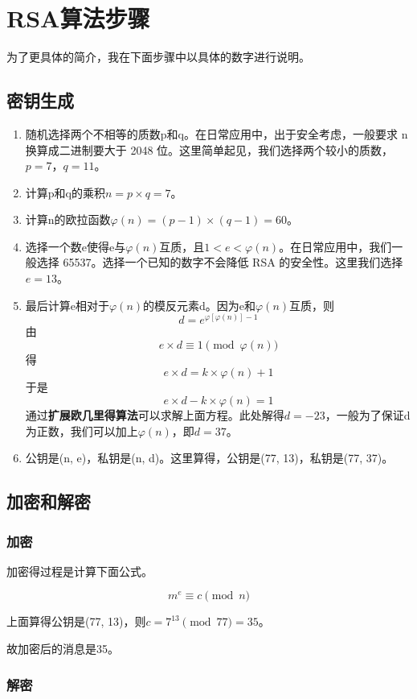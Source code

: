 \chapter{RSA算法步骤}

为了更具体的简介，我在下面步骤中以具体的数字进行说明。

\section{密钥生成}
\begin{enumerate}
    \item 随机选择两个不相等的质数p和q。在日常应用中，出于安全考虑，一般要求 n 换算成二进制要大于 2048 位。这里简单起见，我们选择两个较小的质数，$p=7，q=11$。
    \item 计算p和q的乘积$n = p \times q = 7$。
    \item 计算n的欧拉函数$\varphi(n) = (p-1) \times (q-1) = 60$。
    \item 选择一个数e使得e与$\varphi(n)$互质，且$1 < e < \varphi(n)$。在日常应用中，我们一般选择 65537。选择一个已知的数字不会降低 RSA 的安全性。这里我们选择$e=13$。
    \item 最后计算e相对于$\varphi(n)$的模反元素d。因为e和$\varphi(n)$互质，则
    $$ d = e^{\varphi[\varphi(n)]-1} $$
    由
    $$ e \times d \equiv 1 \pmod{\varphi(n)}$$
    得
    $$ e \times d = k\times \varphi(n) +1 $$
    于是
    $$ e \times d - k\times \varphi(n) = 1$$
    通过\textbf{扩展欧几里得算法}可以求解上面方程。此处解得$d = -23$，一般为了保证d为正数，我们可以加上$\varphi(n)$，即$d = 37$。
    \item 公钥是(n, e)，私钥是(n, d)。这里算得，公钥是(77, 13)，私钥是(77, 37)。
\end{enumerate}

\section{加密和解密}

\subsection{加密}
加密得过程是计算下面公式。

$$ m^e \equiv c \pmod{n}$$

上面算得公钥是(77, 13)，则$ c = 7^{13} \pmod{77} = 35$。

故加密后的消息是35。

\subsection{解密}

